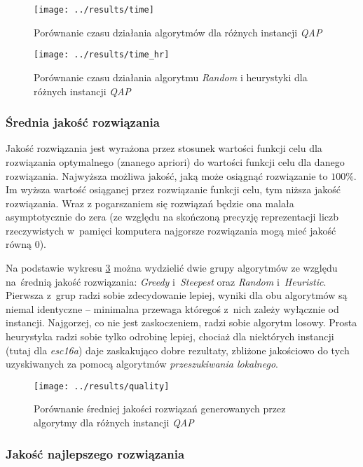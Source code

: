 \documentclass{article}
\begin{document}
			\begin{figure}[h]
				\texttt{[image: ../results/time]}
				\caption{Porównanie czasu działania algorytmów dla różnych instancji \emph{QAP}\label{fig:time}}
			\end{figure}
			
			\begin{figure}[h]
				\texttt{[image: ../results/time\_hr]}
				\caption{Porównanie czasu działania algorytmu \emph{Random} i heurystyki dla różnych instancji \emph{QAP}\label{fig:time_hr}}
			\end{figure}

		\subsubsection{Średnia jakość rozwiązania\label{ss:meanquality}}
Jakość rozwiązania jest wyrażona przez stosunek wartości funkcji celu dla rozwiązania optymalnego (znanego apriori) do wartości funkcji celu dla danego rozwiązania. Najwyższa możliwa jakość, jaką może osiągnąć rozwiązanie to $100\%$. Im wyższa wartość osiąganej przez rozwiązanie funkcji celu, tym niższa jakość rozwiązania. Wraz z pogarszaniem się rozwiązań będzie ona malała asymptotycznie do zera (ze względu na skończoną precyzję reprezentacji liczb rzeczywistych w~pamięci komputera najgorsze rozwiązania mogą mieć jakość równą 0).


			Na podstawie wykresu \ref{fig:quality} można wydzielić dwie grupy algorytmów ze względu na~średnią jakość rozwiązania: \emph{Greedy} i~\emph{Steepest} oraz \emph{Random} i~\emph{Heuristic}. Pierwsza z~grup radzi sobie zdecydowanie lepiej, wyniki dla obu algorytmów są niemal identyczne -- minimalna przewaga któregoś z~nich zależy wyłącznie od instancji. Najgorzej, co nie jest zaskoczeniem, radzi sobie algorytm losowy. Prosta heurystyka radzi sobie tylko odrobinę lepiej, chociaż dla niektórych instancji (tutaj dla \emph{esc16a}) daje zaskakująco dobre rezultaty, zbliżone jakościowo do tych uzyskiwanych za pomocą algorytmów \emph{przeszukiwania lokalnego}.


			\begin{figure}[h]
				\texttt{[image: ../results/quality]}
				\caption{Porównanie średniej jakości rozwiązań generowanych przez algorytmy dla różnych instancji \emph{QAP}\label{fig:quality}}
			\end{figure}

		\subsubsection{Jakość najlepszego rozwiązania}
\end{document}
